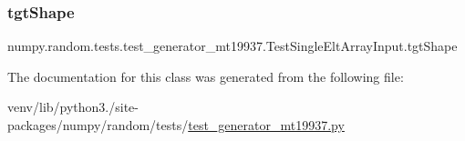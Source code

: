 \subsubsection{\texorpdfstring{tgt\+Shape}{tgtShape}}
{\footnotesize\ttfamily numpy.\+random.\+tests.\+test\+\_\+generator\+\_\+mt19937.\+Test\+Single\+Elt\+Array\+Input.\+tgt\+Shape}



The documentation for this class was generated from the following file\+:\begin{DoxyCompactItemize}
\item 
venv/lib/python3./site-\/packages/numpy/random/tests/\hyperlink{test__generator__mt19937_8py}{test\+\_\+generator\+\_\+mt19937.\+py}\end{DoxyCompactItemize}
